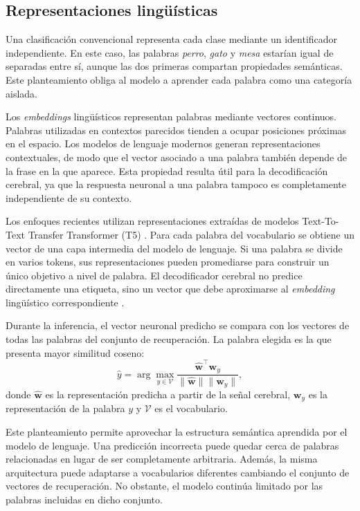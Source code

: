 \subsection{Representaciones lingüísticas}

Una clasificación convencional representa cada clase mediante un identificador independiente. En este caso, las palabras \textit{perro}, \textit{gato} y \textit{mesa} estarían igual de separadas entre sí, aunque las dos primeras compartan propiedades semánticas. Este planteamiento obliga al modelo a aprender cada palabra como una categoría aislada.

Los \textit{embeddings} lingüísticos representan palabras mediante vectores continuos. Palabras utilizadas en contextos parecidos tienden a ocupar posiciones próximas en el espacio. Los modelos de lenguaje modernos generan representaciones contextuales, de modo que el vector asociado a una palabra también depende de la frase en la que aparece. Esta propiedad resulta útil para la decodificación cerebral, ya que la respuesta neuronal a una palabra tampoco es completamente independiente de su contexto.

Los enfoques recientes utilizan representaciones extraídas de modelos Text-To-Text Transfer Transformer (T5) \cite{raffel2020t5}. Para cada palabra del vocabulario se obtiene un vector de una capa intermedia del modelo de lenguaje. Si una palabra se divide en varios tokens, sus representaciones pueden promediarse para construir un único objetivo a nivel de palabra. El decodificador cerebral no predice directamente una etiqueta, sino un vector que debe aproximarse al \textit{embedding} lingüístico correspondiente \cite{dascoli2025words,ozdogan2025libribrain}.

Durante la inferencia, el vector neuronal predicho se compara con los vectores de todas las palabras del conjunto de recuperación. La palabra elegida es la que presenta mayor similitud coseno:
\[
    \hat{y} =
    \arg\max_{y \in \mathcal{V}}
    \frac{\hat{\mathbf{w}}^{\top}\mathbf{w}_{y}}
    {\lVert\hat{\mathbf{w}}\rVert
     \lVert\mathbf{w}_{y}\rVert},
\]
donde \(\hat{\mathbf{w}}\) es la representación predicha a partir de la señal cerebral, \(\mathbf{w}_{y}\) es la representación de la palabra \(y\) y \(\mathcal{V}\) es el vocabulario.

Este planteamiento permite aprovechar la estructura semántica aprendida por el modelo de lenguaje. Una predicción incorrecta puede quedar cerca de palabras relacionadas en lugar de ser completamente arbitraria. Además, la misma arquitectura puede adaptarse a vocabularios diferentes cambiando el conjunto de vectores de recuperación. No obstante, el modelo continúa limitado por las palabras incluidas en dicho conjunto.

